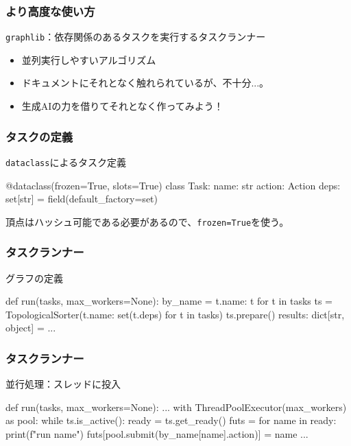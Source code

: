 \documentclass[aspectratio=169,dvipdfmx,12pt,notheorems]{beamer}
\theoremstyle{definition}
\begin{document}
\begin{frame}\frametitle{より高度な使い方}

\begin{block}{\texttt{graphlib}：依存関係のあるタスクを実行するタスクランナー}
\begin{itemize}
\item 並列実行しやすいアルゴリズム
\item ドキュメントにそれとなく触れられているが、不十分...。
\item 生成AIの力を借りてそれとなく作ってみよう！
\end{itemize}
\end{block}

\end{frame}

\begin{frame}[fragile]\frametitle{タスクの定義}
\begin{block}{\texttt{dataclass}によるタスク定義}
\begin{pyverbatim}
@dataclass(frozen=True, slots=True)
class Task:
    name: str
    action: Action
    deps: set[str] = field(default_factory=set)
\end{pyverbatim}
\end{block}
頂点はハッシュ可能である必要があるので、\texttt{frozen=True}を使う。
\end{frame}

\begin{frame}[fragile]\frametitle{タスクランナー}
\begin{block}{グラフの定義}
\begin{pyverbatim}
def run(tasks, max_workers=None):
    by_name = {t.name: t for t in tasks}
    ts = TopologicalSorter({t.name: set(t.deps) for t in tasks})
    ts.prepare()
    results: dict[str, object] = {}
    ...
\end{pyverbatim}
\end{block}
\end{frame}

\begin{frame}[fragile]\frametitle{タスクランナー}
\begin{block}{並行処理：スレッドに投入}
\begin{pyverbatim}
def run(tasks, max_workers=None):
    ...
    with ThreadPoolExecutor(max_workers) as pool:
        while ts.is_active():
            ready = ts.get_ready()
            futs = {}
            for name in ready:
                print(f"run  {name}")
                futs[pool.submit(by_name[name].action)] = name
                ...
\end{pyverbatim}
\end{block}
\end{frame}
\end{document}

